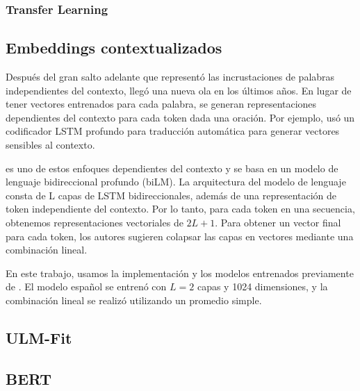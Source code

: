 \subsubsection{Transfer Learning}

\subsection{Embeddings contextualizados}
\label{subsec:elmo}

Después del gran salto adelante que representó las incrustaciones de palabras independientes del contexto, llegó una nueva ola en los últimos años. En lugar de tener vectores entrenados para cada palabra, se generan representaciones dependientes del contexto para cada token dada una oración. Por ejemplo, \citet{mccann2017learned} usó un codificador LSTM profundo para traducción automática para generar vectores sensibles al contexto.

\elmo{} \cite{peters2018} es uno de estos enfoques dependientes del contexto y se basa en un modelo de lenguaje bidireccional profundo (biLM). La arquitectura del modelo de lenguaje consta de L capas de LSTM bidireccionales, además de una representación de token independiente del contexto. Por lo tanto, para cada token en una secuencia, obtenemos representaciones vectoriales de $ 2L + 1 $.
Para obtener un vector final para cada token, los autores sugieren colapsar las capas en vectores mediante una combinación lineal.

%

En este trabajo, usamos la implementación y los modelos entrenados previamente de \cite{che-EtAl:2018:K18-2}. El modelo español se entrenó con $L = 2 $ capas y 1024 dimensiones, y la combinación lineal se realizó utilizando un promedio simple.

\subsection{ULM-Fit}
\subsection{BERT}

